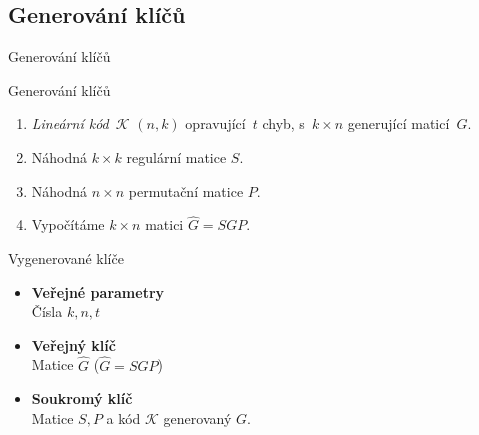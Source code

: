 \documentclass{beamer}
\begin{document}
\subsection{Generování klíčů}
\begin{frame}{Generování klíčů}

        \pause
    \begin{block}{Generování klíčů}
        \begin{enumerate}

            \item \emph{Lineární kód}~$\mathcal{K}$ $(n,k)$
                opravující~$t$ chyb, s~$k \times n$ \alert{generující
                maticí~$G$}.
            \item Náhodná $k \times k$ \alert{regulární matice $S$}.
            \item Náhodná $n \times n$ \alert{permutační matice $P$}.
            \item Vypočítáme $k \times n$ matici $\hat{G} = S G P$.

        \end{enumerate}
    \end{block}

        \pause
    \begin{block}{Vygenerované klíče}
        \begin{itemize}
            \item[] \textbf{Veřejné parametry} \hfil \\
                \hspace{0.5cm} Čísla $k, n, t$
            \item[] \textbf{Veřejný klíč} \hfil \\
                \hspace{0.5cm} Matice $\hat{G}$ ($\hat{G} = S G P$)
            \item[] \textbf{Soukromý klíč} \hfil \\
                \hspace{0.5cm} Matice $S, P$ a kód $\mathcal{K}$ generovaný $G$.
        \end{itemize}
    \end{block}

\end{frame}


\end{document}
